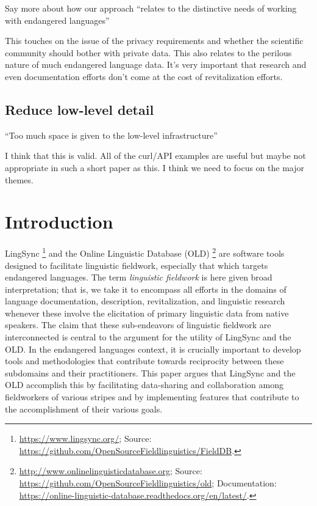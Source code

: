 \documentclass[11pt]{article}
\begin{document}
Say more about how our approach ``relates to the distinctive needs of working
with endangered languages''

This touches on the issue of the privacy requirements and whether the scientific
community should bother with private data. This also relates to the perilous
nature of much endangered language data. It's very important that research and
even documentation efforts don't come at the cost of revitalization efforts.


\subsection{Reduce low-level detail}

``Too much space is given to the low-level infrastructure''

I think that this is valid. All of the curl/API examples are useful but maybe not
appropriate in such a short paper as this. I think we need to focus on the major
themes.







\section{Introduction}
LingSync%
\footnote{\url{https://www.lingsync.org/}; Source:
\url{https://github.com/OpenSourceFieldlinguistics/FieldDB}.} %
and the Online Linguistic Database (OLD)%
\footnote{\url{http://www.onlinelinguisticdatabase.org}; Source:
    \url{https://github.com/OpenSourceFieldlinguistics/old}; Documentation:
\url{https://online-linguistic-database.readthedocs.org/en/latest/}.} %
are software tools designed to facilitate linguistic fieldwork, especially that
which targets endangered languages. The term \textit{linguistic fieldwork} is
here given broad interpretation; that is, we take it to encompass all efforts
in the domains of language documentation, description, revitalization, and
linguistic research whenever these involve the elicitation of primary
linguistic data from native speakers. The claim that these sub-endeavors of
linguistic fieldwork are interconnected is central to the argument for the
utility of LingSync and the OLD. In the endangered languages context, it is
crucially important to develop tools and methodologies that contribute towards
reciprocity between these subdomains and their practitioners. This paper argues
that LingSync and the OLD accomplish this by facilitating data-sharing and
collaboration among fieldworkers of various stripes and by implementing
features that contribute to the accomplishment of their various goals.
\end{document}
